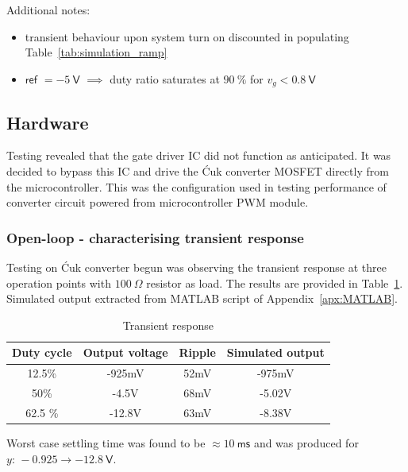 Additional notes:
\begin{itemize}
    \item transient behaviour upon system turn on discounted in populating Table~\ref{tab:simulation_ramp}
    \item $\textsf{ref } = \minus 5 \ \mathsf{V}$ $\implies$ duty ratio saturates at $90 \ \mathsf{\%}$ for $v_g < 0.8 \ \mathsf{V}$
\end{itemize}
\subsection{Hardware}
Testing revealed that the gate driver IC did not function as anticipated. It was decided to bypass this IC and drive the \'{C}uk converter MOSFET directly from the microcontroller. This was the configuration used in testing performance of converter circuit powered from microcontroller PWM module.
\subsubsection{Open-loop - characterising transient response}
Testing on \'{C}uk converter begun was observing the transient response at three operation points with $100 \ \mathsf{\Omega}$ resistor as load. The results are provided in Table~\ref{tab:trans}. Simulated output extracted from \textsf{MATLAB} script of Appendix~\ref{apx:MATLAB}.
\begin{table}[H]
\centering
\begin{tabular}{|c|c|c||c|}
\hline
Duty cycle  & Output voltage & Ripple  & Simulated output \\ \hline \hline
12.5\%      & -925mV         & 52mV     & -975mV \\ \hline
50\%        & -4.5V          & 68mV     & -5.02V\\\hline
62.5 \%     & -12.8V         & 63mV     & -8.38V\\ \hline
\end{tabular}
\caption{Transient response}
\label{tab:trans}
\end{table}
Worst case settling time was found to be $\approx 10 \ \mathsf{ms}$ and was produced for $y \text{: } \minus 0.925 \rightarrow \minus 12.8 \ \mathsf{V}$.

